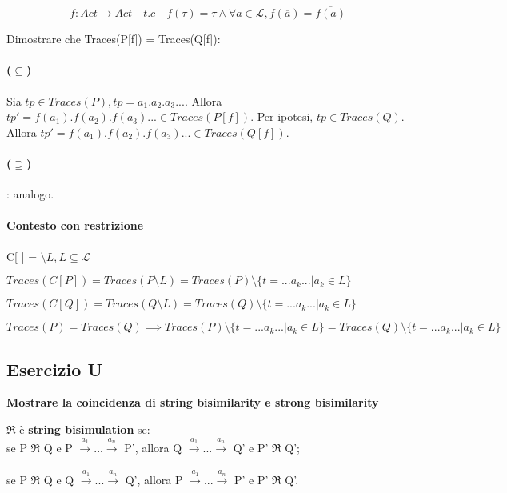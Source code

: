 \begin{equation*}
f: Act \to Act \quad t.c \quad f(\tau) = \tau \land \forall a \in \mathcal{L}, f(\overline{a}) = \overline{f(a)}
\end{equation*}

Dimostrare che Traces(P[f]) = Traces(Q[f]):

\paragraph{($\subseteq$)}

Sia $tp \in Traces(P), tp = a_1.a_2.a_3...$. Allora $tp' = f(a_1).f(a_2).f(a_3)... \in Traces(P[f]).$
Per ipotesi, $tp \in Traces(Q)$. Allora $tp' = f(a_1).f(a_2).f(a_3)... \in Traces(Q[f]).$

\paragraph{($\supseteq$)}: analogo.

\paragraph{Contesto con restrizione}

C[ ] = $\setminus L, L \subseteq \mathcal{L}$

$Traces(C[P]) = Traces(P \setminus L) = Traces(P) \setminus \{ t = ...a_k... | a_k \in L\}$

$Traces(C[Q]) = Traces(Q \setminus L) = Traces(Q) \setminus \{ t = ...a_k... | a_k \in L\}$

$Traces(P) = Traces(Q) \implies Traces(P) \setminus \{ t = ...a_k... | a_k \in L\} = Traces(Q) \setminus \{ t = ...a_k... | a_k \in L\}$

\subsection{Esercizio U}

\textbf{Mostrare la coincidenza di string bisimilarity e strong bisimilarity}

$\Re$ è \textbf{string bisimulation} se:\\

se P $\Re$ Q e P $\xrightarrow[]{a_1} ... \xrightarrow[]{a_n}$ P', allora Q $\xrightarrow[]{a_1} ... \xrightarrow[]{a_n}$ Q' e P' $\Re$ Q';

se P $\Re$ Q e Q $\xrightarrow[]{a_1} ... \xrightarrow[]{a_n}$ Q', allora P $\xrightarrow[]{a_1} ... \xrightarrow[]{a_n}$ P' e P' $\Re$ Q'. \\

